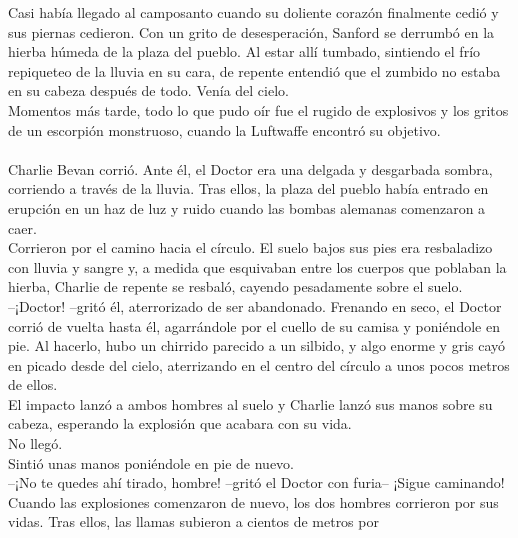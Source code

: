 Casi había llegado al camposanto cuando su doliente corazón finalmente
cedió y sus piernas cedieron. Con un grito de desesperación, Sanford se
derrumbó en la hierba húmeda de la plaza del pueblo. Al estar allí
tumbado, sintiendo el frío repiqueteo de la lluvia en su cara, de
repente entendió que el zumbido no estaba en su cabeza después de todo.
Venía del cielo.\\
Momentos más tarde, todo lo que pudo oír fue el rugido de explosivos y
los gritos de un escorpión monstruoso, cuando la Luftwaffe encontró su
objetivo.\\
\hspace*{0.333em}\hspace*{0.333em}\hspace*{0.333em}\hspace*{0.333em}\hspace*{0.333em}\hspace*{0.333em}\hspace*{0.333em}\hspace*{0.333em}\\
Charlie Bevan corrió. Ante él, el Doctor era una delgada y desgarbada
sombra, corriendo a través de la lluvia. Tras ellos, la plaza del pueblo
había entrado en erupción en un haz de luz y ruido cuando las bombas
alemanas comenzaron a caer.\\
Corrieron por el camino hacia el círculo. El suelo bajos sus pies era
resbaladizo con lluvia y sangre y, a medida que esquivaban entre los
cuerpos que poblaban la hierba, Charlie de repente se resbaló, cayendo
pesadamente sobre el suelo.\\
--¡Doctor! --gritó él, aterrorizado de ser abandonado. Frenando en seco,
el Doctor corrió de vuelta hasta él, agarrándole por el cuello de su
camisa y poniéndole en pie. Al hacerlo, hubo un chirrido parecido a un
silbido, y algo enorme y gris cayó en picado desde del cielo,
aterrizando en el centro del círculo a unos pocos metros de ellos.\\
El impacto lanzó a ambos hombres al suelo y Charlie lanzó sus manos
sobre su cabeza, esperando la explosión que acabara con su vida.\\
No llegó.\\
Sintió unas manos poniéndole en pie de nuevo.\\
--¡No te quedes ahí tirado, hombre! --gritó el Doctor con furia-- ¡Sigue
caminando!\\
Cuando las explosiones comenzaron de nuevo, los dos hombres corrieron
por sus vidas. Tras ellos, las llamas subieron a cientos de metros por
